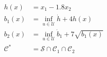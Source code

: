 \documentclass[preview]{standalone}
\begin{document}
\begin{align*}
h(x) &= x_1 - 1.8 x_2\\ b_1(x) &= \inf_{u \in \mathcal{U}} \dot h +  4h(x)\\ b_2(x) &= \inf_{u \in \mathcal{U}} \dot b_1 +  7\sqrt{b_1(x)}\\ \mathcal{C}^* &= \mathcal{S} \cap \mathcal{C}_1 \cap \mathcal{C}_2
\end{align*}
\end{document}

